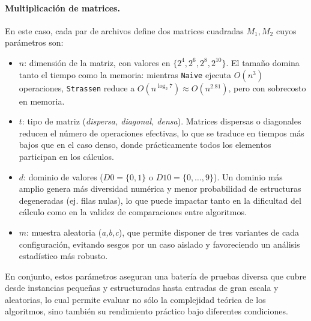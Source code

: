 \paragraph{Multiplicación de matrices.} 
En este caso, cada par de archivos define dos matrices cuadradas $M_1, M_2$ cuyos parámetros son:
\begin{itemize}
    \item $n$: dimensión de la matriz, con valores en $\{2^4,2^6,2^8,2^{10}\}$. El tamaño domina tanto el tiempo 
    como la memoria: mientras \texttt{Naive} ejecuta $O(n^3)$ operaciones, \texttt{Strassen} reduce a 
    $O(n^{\log_2 7}) \approx O(n^{2.81})$, pero con sobrecosto en memoria.
    \item $t$: tipo de matriz (\textit{dispersa, diagonal, densa}). Matrices dispersas o diagonales reducen 
    el número de operaciones efectivas, lo que se traduce en tiempos más bajos que en el caso denso, donde 
    prácticamente todos los elementos participan en los cálculos.
    \item $d$: dominio de valores ($D0=\{0,1\}$ o $D10=\{0,\dots,9\}$). Un dominio más amplio genera más diversidad 
    numérica y menor probabilidad de estructuras degeneradas (ej. filas nulas), lo que puede impactar tanto 
    en la dificultad del cálculo como en la validez de comparaciones entre algoritmos.
    \item $m$: muestra aleatoria (\textit{a,b,c}), que permite disponer de tres variantes de cada configuración, 
    evitando sesgos por un caso aislado y favoreciendo un análisis estadístico más robusto.
\end{itemize}

En conjunto, estos parámetros aseguran una batería de pruebas diversa que cubre desde instancias pequeñas y 
estructuradas hasta entradas de gran escala y aleatorias, lo cual permite evaluar no sólo la complejidad teórica 
de los algoritmos, sino también su rendimiento práctico bajo diferentes condiciones.
